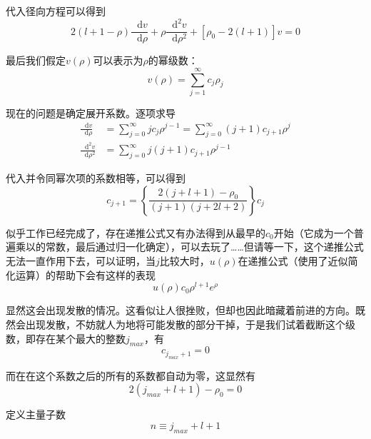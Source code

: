 \documentclass[UTF8]{ctexart}
\newcommand*{\dif}{\mathop{}\!\mathrm{d}}
\begin{document}
\noindent 代入径向方程可以得到
\begin{equation}
    2(l+1-\rho) \frac{\mathop{}\!\mathrm{d} v}{\mathop{}\!\mathrm{d} \rho} + \rho \frac{\mathop{}\!\mathrm{d}^2 v}{\mathop{}\!\mathrm{d} \rho^2} + \left[\rho_0 - 2(l+1)\right]v = 0
\end{equation}

    最后我们假定$v(\rho)$可以表示为$\rho$的幂级数：
    \begin{equation}
        v(\rho) = \sum_{j=1}^{\infty} c_j \rho_j
    \end{equation}

\noindent 现在的问题是确定展开系数。逐项求导
\begin{equation}
    \begin{aligned}
        \frac{\dif v}{\dif \rho} &=\sum_{j=0}^{\infty} j c_j \rho^{j-1} = \sum_{j=0}^{\infty}(j+1)c_{j+1} \rho^j \\
        \frac{\dif^2 v}{\dif \rho^2} &= \sum_{j=0}^{\infty} j(j+1)c_{j+1}\rho^{j-1}
    \end{aligned}
\end{equation}

\noindent 代入并令同幂次项的系数相等，可以得到
\begin{equation}
    c_{j+1}=\left\{\frac{2(j+l+1)-\rho_{0}}{(j+1)(j+2 l+2)}\right\} c_{j}
    \end{equation}

    似乎工作已经完成了，存在递推公式又有办法得到从最早的$c_0$开始（它成为一个普遍乘以的常数，最后通过归一化确定），可以去玩了……但请等一下，这个递推公式无法一直作用下去，可以证明，当$j$比较大时，$u(\rho)$在递推公式（使用了近似简化运算）的帮助下会有这样的表现
    \begin{equation}
        u(\rho) c_0 \rho^{l+1} e^{\rho} 
    \end{equation}

\noindent 显然这会出现发散的情况。这看似让人很挫败，但却也因此暗藏着前进的方向。既然会出现发散，不妨就人为地将可能发散的部分干掉，于是我们试着截断这个级数，即存在某个最大的整数$j_{max}$，有 
\begin{equation}
    c_{j_{max}+1} = 0
\end{equation}

\noindent 而在在这个系数之后的所有的系数都自动为零，这显然有
\begin{equation}
    2(j_{max}+l+1) - \rho_0 =0
\end{equation}

\noindent 定义主量子数
\begin{equation}
    n \equiv j_{max} + l +1
\end{equation}
\end{document}
